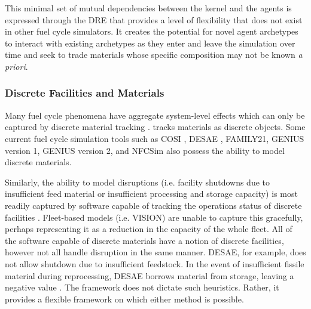 This minimal set of mutual dependencies between the kernel and the agents is
expressed through the \gls{DRE} that provides a level of flexibility that does
not exist in other fuel cycle simulators.  It creates the potential for novel
agent archetypes to interact with existing archetypes as they enter and leave
the simulation over time and seek to trade materials whose specific
composition may not be known \textit{a priori}.

\subsubsection{Discrete Facilities and Materials}

Many fuel cycle phenomena have aggregate system-level effects which can only be
captured by discrete material tracking \cite{huff_next_2010}.  \Cyclus
tracks materials as discrete objects. Some current fuel cycle simulation tools
such as \gls{COSI}
\cite{mccarthy_benchmark_2012,grasso_nea-wpfc/fcts_2009,guerin_benchmark_2009},
\gls{DESAE}
\cite{andrianova_desae_2008}, FAMILY21\cite{mccarthy_benchmark_2012},
\gls{GENIUS} version 1, \gls{GENIUS} version 2, and \gls{NFCSim} also possess the ability to
model discrete materials.

Similarly, the ability to model disruptions (i.e. facility shutdowns due to
insufficient feed material or insufficient processing and storage capacity) is
most readily captured by software capable of tracking the operations status of
discrete facilities \cite{huff_next_2010}.  Fleet-based models (i.e.
\gls{VISION}) are unable to capture this gracefully, perhaps representing it as 
a reduction in the capacity of the whole fleet.  All of the software
capable of discrete materials have a notion of discrete facilities, however not
all handle disruption in the same manner. \gls{DESAE}, for example, does not
allow shutdown due to insufficient feedstock. In the event
of insufficient fissile material during reprocessing, \gls{DESAE} borrows
material from storage, leaving a negative value \cite{mccarthy_benchmark_2012}.
The \Cyclus framework does not dictate such heuristics. Rather, it provides a
flexible framework on which either method is possible.
